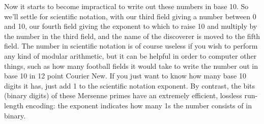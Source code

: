 \documentclass[12pt]{article}
\begin{document}
Now it starts to become impractical to write out these numbers in base 10. So we'll settle for scientific notation, with our third field giving a number between 0 and 10, our fourth field giving the exponent to which to raise 10 and multiply by the number in the third field, and the name of the discoverer is moved to the fifth field. The number in scientific notation is of course useless if you wish to perform any kind of modular arithmetic, but it can be helpful in order to computer other things, such as how many football fields it would take to write the number out in base 10 in 12 point Courier New. If you just want to know how many base 10 digits it has, just add 1 to the scientific notation exponent. By contrast, the bits (binary digits) of these Mersenne primes have an extremely efficient, lossless run-length encoding: the exponent indicates how many 1s the number consists of in binary.
\end{document}
